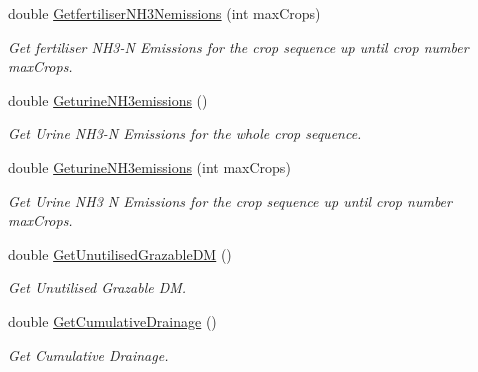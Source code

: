\begin{DoxyCompactItemize}
double \mbox{\hyperlink{class_crop_sequence_class_a61ef6bc1ddc06e99da8951319e1082d9}{Getfertiliser\+N\+H3\+Nemissions}} (int max\+Crops)
\begin{DoxyCompactList}\small\item\em Get fertiliser N\+H3-\/N Emissions for the crop sequence up until crop number max\+Crops. \end{DoxyCompactList}\item 
\mbox{\label{class_crop_sequence_class_a8016dda941183a9d6c82e843be2016c4}} 
double \mbox{\hyperlink{class_crop_sequence_class_a8016dda941183a9d6c82e843be2016c4}{Geturine\+N\+H3emissions}} ()
\begin{DoxyCompactList}\small\item\em Get Urine N\+H3-\/N Emissions for the whole crop sequence. \end{DoxyCompactList}\item 
double \mbox{\hyperlink{class_crop_sequence_class_a860cad5b4e23c37dee4bd95ecf59ffd5}{Geturine\+N\+H3emissions}} (int max\+Crops)
\begin{DoxyCompactList}\small\item\em Get Urine N\+H3 N Emissions for the crop sequence up until crop number max\+Crops. \end{DoxyCompactList}\item 
\mbox{\label{class_crop_sequence_class_a5a8f90566c9a156ed63c8288b5680456}} 
double \mbox{\hyperlink{class_crop_sequence_class_a5a8f90566c9a156ed63c8288b5680456}{Get\+Unutilised\+Grazable\+DM}} ()
\begin{DoxyCompactList}\small\item\em Get Unutilised Grazable DM. \end{DoxyCompactList}\item 
\mbox{\label{class_crop_sequence_class_ad116e8e609a06cfe2786fc329ac904a7}} 
double \mbox{\hyperlink{class_crop_sequence_class_ad116e8e609a06cfe2786fc329ac904a7}{Get\+Cumulative\+Drainage}} ()
\begin{DoxyCompactList}\small\item\em Get Cumulative Drainage. \end{DoxyCompactList}\item 
\mbox{\label{class_crop_sequence_class_ace737f0ef9c1015f13b5337a85a4b9f6}} 

\end{DoxyCompactItemize}
